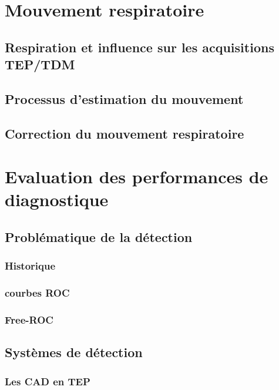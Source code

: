 \documentclass[12pt]{book}
\begin{document}
\part{Mouvement respiratoire}
%	

	\chapter{Respiration et influence sur les acquisitions TEP/TDM}
	
	
	\chapter{Processus d'estimation du mouvement}
	
	
	\chapter{Correction du mouvement respiratoire}
	

\part{Evaluation des performances de diagnostique}
	\chapter{Problématique de la détection}
		\section{Historique}
		\section{courbes ROC}
		\section{Free-ROC}	
	
	\chapter{Systèmes de détection}
		\section{Les CAD en TEP}
\end{document}

